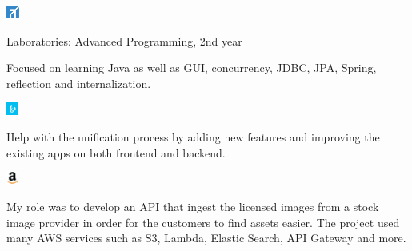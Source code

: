 \documentclass[a4paper]{MagicalCV}
\begin{document}
\hfill
\begin{minipage}[t]{0.59\textwidth} 



\includegraphics[height=4mm]{fii.jpg}
 \\
\vspace{\topsep} %
\begin{tightemize}
    \item Laboratories: Advanced Programming, 2nd year
    \item Focused on learning Java as well as GUI, concurrency, JDBC, JPA, Spring, reflection and internalization.
\end{tightemize}
\sectionsep

\includegraphics[height=4mm]{bandwidth.png}
 \\
\vspace{\topsep} %
\begin{tightemize}
    \item \justify Help with the unification process by adding new features and improving the existing apps on both frontend and
    backend.
    
\end{tightemize}
\sectionsep

\includegraphics[height=4mm]{amazon.jpg} 
 \\
\vspace{\topsep} %
\begin{tightemize}
    \item \justify My role was to develop an API that ingest the 
          licensed images from a stock image provider in order for the customers to find
          assets easier. The project used many AWS services such as S3, Lambda,
          Elastic Search, API Gateway and more.
\end{tightemize}
\sectionsep


\end{minipage}
\end{document}
